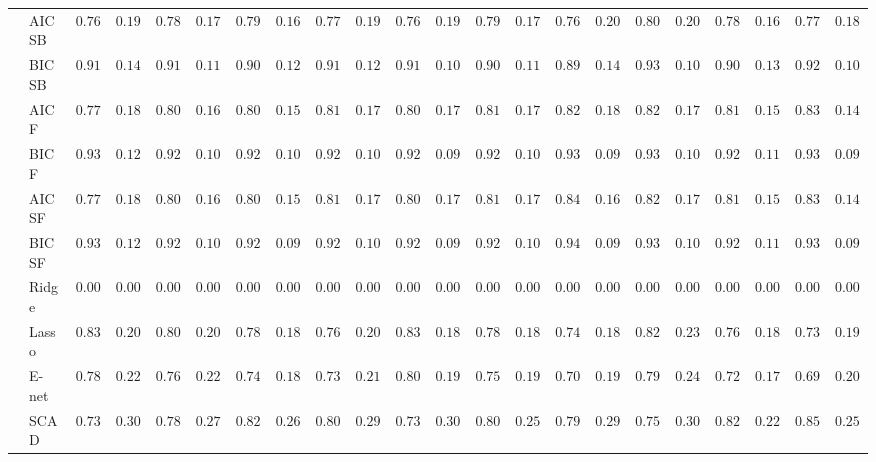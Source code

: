 \begin{tabular}{ll|ll|llllll|llllll|llllll}
 & AIC SB  & $0.7600$ & $0.1929$ & $0.7850$ & $0.1713$ & $0.7950$ & $0.1689$ & $0.7767$ & $0.1942$ & $0.7683$ & $0.1923$ & $0.7933$ & $0.1710$ & $0.7683$ & $0.2064$ & $0.8000$ & $0.2010$ & $0.7867$ & $0.1660$ & $0.7767$ & $0.1838$ \\
 & BIC SB  & $0.9133$ & $0.1450$ & $0.9167$ & $0.1124$ & $0.9033$ & $0.1258$ & $0.9100$ & $0.1285$ & $0.9183$ & $0.1019$ & $0.9083$ & $0.1193$ & $0.8900$ & $0.1445$ & $0.9317$ & $0.1062$ & $0.9017$ & $0.1300$ & $0.9217$ & $0.1071$ \\
 & AIC F  & $0.7783$ & $0.1836$ & $0.8000$ & $0.1675$ & $0.8067$ & $0.1512$ & $0.8133$ & $0.1761$ & $0.8000$ & $0.1741$ & $0.8100$ & $0.1741$ & $0.8283$ & $0.1827$ & $0.8200$ & $0.1752$ & $0.8100$ & $0.1554$ & $0.8317$ & $0.1451$ \\
 & BIC F  & $0.9333$ & $0.1231$ & $0.9233$ & $0.1017$ & $0.9200$ & $0.1018$ & $0.9250$ & $0.1095$ & $0.9250$ & $0.0987$ & $0.9233$ & $0.1044$ & $0.9383$ & $0.0967$ & $0.9350$ & $0.1030$ & $0.9233$ & $0.1122$ & $0.9333$ & $0.0977$ \\
 & AIC SF  & $0.7783$ & $0.1836$ & $0.8000$ & $0.1675$ & $0.8067$ & $0.1512$ & $0.8133$ & $0.1761$ & $0.8017$ & $0.1703$ & $0.8117$ & $0.1703$ & $0.8483$ & $0.1677$ & $0.8200$ & $0.1752$ & $0.8100$ & $0.1554$ & $0.8333$ & $0.1441$ \\
 & BIC SF  & $0.9333$ & $0.1231$ & $0.9233$ & $0.1017$ & $0.9217$ & $0.0990$ & $0.9250$ & $0.1095$ & $0.9250$ & $0.0987$ & $0.9233$ & $0.1044$ & $0.9417$ & $0.0959$ & $0.9350$ & $0.1030$ & $0.9250$ & $0.1121$ & $0.9333$ & $0.0977$ \\
 & Ridge  & $0.0000$ & $0.0000$ & $0.0000$ & $0.0000$ & $0.0000$ & $0.0000$ & $0.0000$ & $0.0000$ & $0.0000$ & $0.0000$ & $0.0000$ & $0.0000$ & $0.0000$ & $0.0000$ & $0.0000$ & $0.0000$ & $0.0000$ & $0.0000$ & $0.0000$ & $0.0000$ \\
 & Lasso  & $0.8317$ & $0.2072$ & $0.8000$ & $0.2065$ & $0.7883$ & $0.1878$ & $0.7683$ & $0.2036$ & $0.8383$ & $0.1842$ & $0.7867$ & $0.1896$ & $0.7483$ & $0.1873$ & $0.8283$ & $0.2351$ & $0.7650$ & $0.1806$ & $0.7367$ & $0.1970$ \\
 & E-net  & $0.7867$ & $0.2261$ & $0.7600$ & $0.2214$ & $0.7467$ & $0.1857$ & $0.7300$ & $0.2142$ & $0.8067$ & $0.1935$ & $0.7533$ & $0.1975$ & $0.7083$ & $0.1944$ & $0.7917$ & $0.2489$ & $0.7250$ & $0.1794$ & $0.6967$ & $0.2084$ \\
 & SCAD  & $0.7383$ & $0.3091$ & $0.7800$ & $0.2761$ & $0.8250$ & $0.2631$ & $0.8083$ & $0.2905$ & $0.7367$ & $0.3099$ & $0.8033$ & $0.2577$ & $0.7900$ & $0.2955$ & $0.7533$ & $0.3057$ & $0.8217$ & $0.2213$ & $0.8500$ & $0.2557$ \\

\end{tabular}
